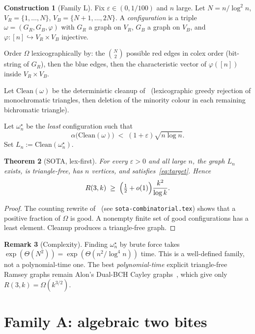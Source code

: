\documentclass[11pt]{article}
\newtheorem{theorem}{Theorem}
\theoremstyle{definition}
\newtheorem{remark}[theorem]{Remark}
\newtheorem{construction}[theorem]{Construction}
\newcommand{\eps}{\varepsilon}
\begin{document}
\begin{construction}[Family L]\label{con:L}
Fix $\eps\in(0,1/100)$ and $n$ large.
Let $N=n/\log^{2}n$, $V_{R}=\{1,\dots,N\}$, $V_{B}=\{N+1,\dots,2N\}$.
A \emph{configuration} is a triple $\omega=(G_{R},G_{B},\varphi)$ with $G_{R}$ a graph on $V_{R}$, $G_{B}$ a graph on $V_{B}$, and $\varphi\colon[n]\hookrightarrow V_{R}\times V_{B}$ injective.

Order $\Omega$ lexicographically by:
the $N\choose 2$ possible red edges in colex order (bit-string of $G_{R}$),
then the blue edges,
then the characteristic vector of $\varphi([n])$ inside $V_{R}\times V_{B}$.

Let $\mathrm{Clean}(\omega)$ be the deterministic cleanup of~\cite{HHKP2025}
(lexicographic greedy rejection of monochromatic triangles, then deletion of the minority colour in each remaining bichromatic triangle).

Let $\omega_{n}^{\star}$ be the \emph{least} configuration such that
\[
  \alpha\bigl(\mathrm{Clean}(\omega)\bigr)\;<\;(1+\eps)\sqrt{n\log n}.
\]
Set $L_n:=\mathrm{Clean}(\omega_{n}^{\star})$.
\end{construction}

\begin{theorem}[SOTA, lex-first]\label{thm:L}
For every $\eps>0$ and all large $n$, the graph $L_n$ exists, is triangle-free, has $n$ vertices, and satisfies~\eqref{eq:target}.
Hence
\[
  R(3,k)\;\ge\;\Bigl(\tfrac12+o(1)\Bigr)\frac{k^{2}}{\log k}.
\]
\end{theorem}

\begin{proof}
The counting rewrite of~\cite{HHKP2025} (see \texttt{sota-combinatorial.tex}) shows that a positive fraction of $\Omega$ is good.
A nonempty finite set of good configurations has a least element.
Cleanup produces a triangle-free graph.
\end{proof}

\begin{remark}[Complexity]
Finding $\omega_{n}^{\star}$ by brute force takes $\exp(\Theta(N^{2}))=\exp(\Theta(n^{2}/\log^{4}n))$ time.
This is a well-defined family, not a polynomial-time one.
The best \emph{polynomial-time} explicit triangle-free Ramsey graphs remain Alon's Dual-BCH Cayley graphs~\cite{Alon1994}, which give only $R(3,k)=\Omega(k^{3/2})$.
\end{remark}

\section{Family A: algebraic two bites}
\end{document}
